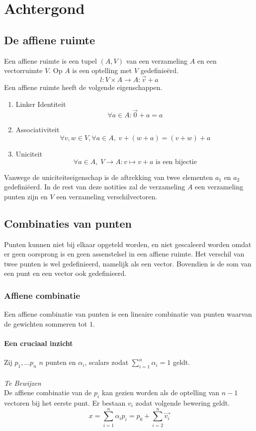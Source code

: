 \documentclass[computergesteund_ontwerp_van_curven_en_oppervlakken.tex]{subfiles}
\begin{document}
\chapter{Achtergond}
\section{De affiene ruimte}
Een affiene ruimte is een tupel $(A,V)$ van een verzameling $A$ en een vectorruimte $V$. Op $A$ is een optelling met $V$ gedefinie\"erd.
\[
l: V \times A \rightarrow A: \vec{v}+a
\]
Een affiene ruimte heeft de volgende eigenschappen.
\begin{enumerate}
\item Linker Identiteit
\[
\forall a \in A: \vec{0} + a = a
\]
\item Associativiteit
\[
\forall v, w \in V, \forall a \in A,\; v + (w + a) = (v + w) + a
\]
\item Uniciteit
\[
\forall a \in A,\; V \to A\colon v \mapsto v + a \text{ is een bijectie}\]
\end{enumerate}
Vanwege de uniciteitseigenschap is de aftrekking van twee elementen $a_1$ en $a_2$ gedefini\"eerd. In de rest van deze notities zal de verzameling $A$ een verzameling punten zijn en $V$ een verzameling verschilvectoren.


\section{Combinaties van punten}
Punten kunnen niet bij elkaar opgeteld worden, en niet gescaleerd worden omdat er geen oorsprong is en geen assenstelsel in een affiene ruimte.
Het verschil van twee punten is wel gedefinieerd, namelijk als een vector. Bovendien is de som van een punt en een vector ook gedefinieerd.
\subsection{Affiene combinatie}
Een affiene combinatie van punten is een lineaire combinatie van punten waarvan de gewichten sommeren tot $1$.
\subsubsection{Een cruciaal inzicht}
Zij $p_1,...p_n$ $n$ punten en $\alpha_i$, scalars zodat $\sum_{i=1}^n\alpha_i=1$ geldt.\\\\
\textit{Te Bewijzen}\\
\label{affiene_combinatie}
De affiene combinatie van de $p_i$ kan gezien worden als de optelling van $n-1$ vectoren bij het eerste punt.
Er bestaan $v_i$ zodat volgende bewering geldt.
\[
x = \sum_{i=1}^n\alpha_ip_i = p_0 + \sum_{i=2}^n\vec{v_i}
\]
\end{document}
